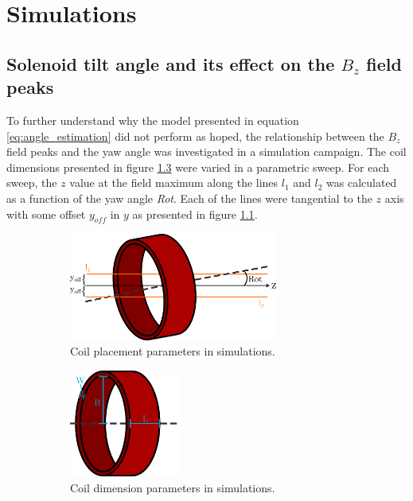 \chapter{Simulations}

\section{Solenoid tilt angle and its effect on the $B_z$ field peaks}
\label{sec:simulations}

To further understand why the model presented in equation
\ref{eq:angle_estimation} did not perform as hoped, the relationship
between the $B_z$ field peaks and the yaw angle was investigated in
a simulation campaign. The coil dimensions presented in figure
\ref{fig:sim-mag-dims} were varied in a parametric sweep.
For each sweep, the $z$ value at the field maximum along the lines $l_1$ and $l_2$
was calculated as a function of the yaw angle \emph{Rot}. Each
of the lines were tangential to the $z$ axis with some offset
$y_{off}$ in $y$ as presented in figure \ref{fig:sim-mag-rot}.

\begin{figure}[h!]
    \centering
    \begin{subfigure}[b]{0.4\textwidth}
        \centering
        \includegraphics[height=100pt]{figs/sim_mag_rot}
        \caption{Coil placement parameters in simulations.}
        \label{fig:sim-mag-rot}
    \end{subfigure}
    \hfill
    \begin{subfigure}[b]{0.4\textwidth}
        \centering
        \includegraphics[height=100pt]{figs/sim_mag_dims}
        \caption{Coil dimension parameters in simulations.}
        \label{fig:sim-mag-dims}
    \end{subfigure}
    \caption{}
\end{figure}

